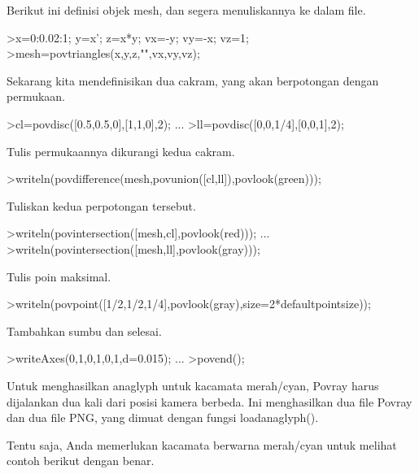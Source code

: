 \documentclass[a4paper,10pt]{article}
\begin{document}
\begin{eulernotebook}
\begin{eulercomment}
\begin{eulercomment}
\begin{eulercomment}
Berikut ini definisi objek mesh, dan segera menuliskannya ke dalam
file.
\end{eulercomment}
\begin{eulerprompt}
>x=0:0.02:1; y=x'; z=x*y; vx=-y; vy=-x; vz=1;
>mesh=povtriangles(x,y,z,"",vx,vy,vz);
\end{eulerprompt}
\begin{eulercomment}
Sekarang kita mendefinisikan dua cakram, yang akan berpotongan dengan
permukaan.
\end{eulercomment}
\begin{eulerprompt}
>cl=povdisc([0.5,0.5,0],[1,1,0],2); ...
>ll=povdisc([0,0,1/4],[0,0,1],2);
\end{eulerprompt}
\begin{eulercomment}
Tulis permukaannya dikurangi kedua cakram.
\end{eulercomment}
\begin{eulerprompt}
>writeln(povdifference(mesh,povunion([cl,ll]),povlook(green)));
\end{eulerprompt}
\begin{eulercomment}
Tuliskan kedua perpotongan tersebut.
\end{eulercomment}
\begin{eulerprompt}
>writeln(povintersection([mesh,cl],povlook(red))); ...
>writeln(povintersection([mesh,ll],povlook(gray)));
\end{eulerprompt}
\begin{eulercomment}
Tulis poin maksimal.
\end{eulercomment}
\begin{eulerprompt}
>writeln(povpoint([1/2,1/2,1/4],povlook(gray),size=2*defaultpointsize));
\end{eulerprompt}
\begin{eulercomment}
Tambahkan sumbu dan selesai.
\end{eulercomment}
\begin{eulerprompt}
>writeAxes(0,1,0,1,0,1,d=0.015); ...
>povend();
\end{eulerprompt}
\begin{eulercomment}
Untuk menghasilkan anaglyph untuk kacamata merah/cyan, Povray harus
dijalankan dua kali dari posisi kamera berbeda. Ini menghasilkan dua
file Povray dan dua file PNG, yang dimuat dengan fungsi
loadanaglyph().

Tentu saja, Anda memerlukan kacamata berwarna merah/cyan untuk melihat
contoh berikut dengan benar.


\end{eulercomment}
\end{eulercomment}
\end{eulercomment}
\end{eulernotebook}
\end{document}
